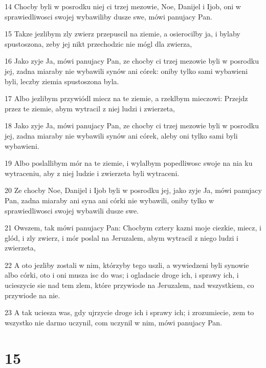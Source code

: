 \par 14 Chocby byli w posrodku niej ci trzej mezowie, Noe, Danijel i Ijob, oni w sprawiedliwosci swojej wybawiliby dusze swe, mówi panujacy Pan.
\par 15 Takze jezlibym zly zwierz przepuscil na ziemie, a osierocilby ja, i bylaby spustoszona, zeby jej nikt przechodzic nie mógl dla zwierza,
\par 16 Jako zyje Ja, mówi panujacy Pan, ze chocby ci trzej mezowie byli w posrodku jej, zadna miaraby nie wybawili synów ani córek: oniby tylko sami wybawieni byli, leczby ziemia spustoszona byla.
\par 17 Albo jezlibym przywiódl miecz na te ziemie, a rzeklbym mieczowi: Przejdz przez te ziemie, abym wytracil z niej ludzi i zwierzeta,
\par 18 Jako zyje Ja, mówi panujacy Pan, ze chocby ci trzej mezowie byli w posrodku jej, zadna miaraby nie wybawili synów ani córek, aleby oni tylko sami byli wybawieni.
\par 19 Albo poslallibym mór na te ziemie, i wylalbym popedliwosc swoje na nia ku wytraceniu, aby z niej ludzie i zwierzeta byli wytraceni.
\par 20 Ze chocby Noe, Danijel i Ijob byli w posrodku jej, jako zyje Ja, mówi panujacy Pan, zadna miaraby ani syna ani córki nie wybawili, oniby tylko w sprawiedliwosci swojej wybawili dusze swe.
\par 21 Owszem, tak mówi panujacy Pan: Chocbym cztery kazni moje ciezkie, miecz, i glód, i zly zwierz, i mór poslal na Jeruzalem, abym wytracil z niego ludzi i zwierzeta,
\par 22 A oto jezliby zostali w nim, którzyby tego uszli, a wywiedzeni byli synowie albo córki, oto i oni musza isc do was; i ogladacie droge ich, i sprawy ich, i ucieszycie sie nad tem zlem, które przywiode na Jeruzalem, nad wszystkiem, co przywiode na nie.
\par 23 A tak uciesza was, gdy ujrzycie droge ich i sprawy ich; i zrozumiecie, zem to wszystko nie darmo uczynil, com uczynil w nim, mówi panujacy Pan.

\chapter{15}


